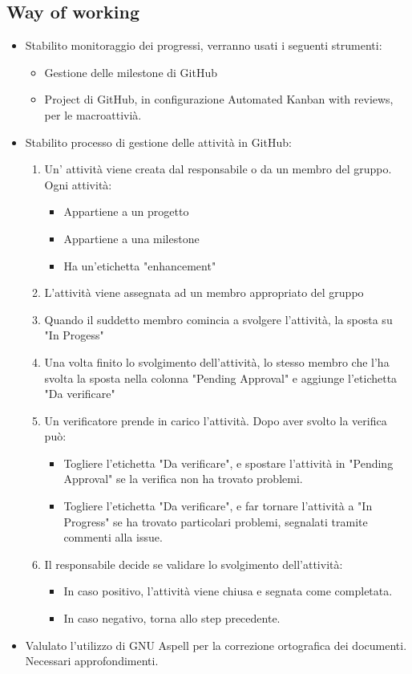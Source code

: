 \documentclass[a4paper, oneside, openany, dvipsnames, table]{article}
\begin{document}
\subsection{Way of working}
\begin{itemize}
\item Stabilito monitoraggio dei progressi, verranno usati i seguenti strumenti:
\begin{itemize}
	\item Gestione delle milestone di GitHub
	\item Project di GitHub, in configurazione Automated Kanban with reviews, per le macroattivià.
\end{itemize}


\item Stabilito processo di gestione delle attività in GitHub:
	\begin{enumerate}
	\item Un' attività viene creata dal responsabile o da un membro del gruppo. Ogni attività:
		\begin{itemize}
			\item Appartiene a un progetto
			\item Appartiene a una milestone
			\item Ha un'etichetta "enhancement"
		\end{itemize}
	\item L'attività viene assegnata ad un membro appropriato del gruppo
	\item Quando il suddetto membro comincia a svolgere l'attività, la sposta su "In Progess"
	\item Una volta finito lo svolgimento dell'attività, lo stesso membro che l'ha svolta la sposta
		  nella colonna "Pending Approval" e aggiunge l'etichetta "Da verificare"
	\item Un verificatore prende in carico l'attività. Dopo aver svolto la verifica può:
	\begin{itemize}
		\item Togliere l'etichetta "Da verificare", e spostare l'attività in "Pending Approval" se la verifica non ha trovato
			  problemi.
		\item Togliere l'etichetta "Da verificare", e far tornare l'attività a "In Progress" se ha trovato particolari problemi,
		      segnalati tramite commenti alla issue.
	\end{itemize}
	\item Il responsabile decide se validare lo svolgimento dell'attività:
	\begin{itemize}
		\item In caso positivo, l'attività viene chiusa e segnata come completata.
		\item In caso negativo, torna allo step precedente.
	\end{itemize}
	\end{enumerate}	
\item Valulato l'utilizzo di GNU Aspell per la correzione ortografica dei documenti.
	  Necessari approfondimenti.
\end{itemize}




\newpage
\end{document}
